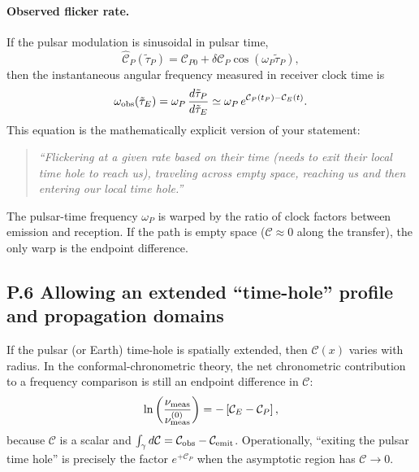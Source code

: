 \documentclass[10pt]{article}
\newcommand{\Eclk}{E}
\begin{document}
\paragraph{Observed flicker rate.}
If the pulsar modulation is sinusoidal in pulsar time,
\begin{equation}
\widehat{\mathcal{C}}_P(\tilde\tau_P)=\mathcal{C}_{P0}+\delta\mathcal{C}_P\cos(\omega_P\tilde\tau_P),
\label{eq:P_sine}
\end{equation}
then the instantaneous angular frequency measured in receiver clock time is
\begin{equation}
\omega_{\rm obs}(\tilde\tau_{\Eclk})
=
\omega_P\,\frac{d\tilde\tau_P}{d\tilde\tau_{\Eclk}}
\simeq
\omega_P\,e^{\mathcal{C}_P(t_P)-\mathcal{C}_{\Eclk}(t)}.
\label{eq:P_omega_obs}
\end{equation}
This equation is the mathematically explicit version of your statement:
\begin{quote}
\emph{``Flickering at a given rate based on their time (needs to exit their local time hole to reach us),
traveling across empty space, reaching us and then entering our local time hole.''}
\end{quote}
The pulsar-time frequency $\omega_P$ is warped by the ratio of clock factors between emission and reception.
If the path is empty space ($\mathcal{C}\approx0$ along the transfer), the only warp is the endpoint difference.

\subsection{P.6 Allowing an extended ``time-hole'' profile and propagation domains}
\label{app:pta:extended}

If the pulsar (or Earth) time-hole is spatially extended, then $\mathcal{C}(x)$ varies with radius.
In the conformal-chronometric theory, the net chronometric contribution to a frequency comparison is still
an endpoint difference in $\mathcal{C}$:
\begin{equation}
\ln\left(\frac{\nu_{\rm meas}}{\nu_{\rm meas}^{(0)}}\right)
=
-\left[\mathcal{C}_{\Eclk}-\mathcal{C}_P\right],
\label{eq:P_endpoint_difference}
\end{equation}
because $\mathcal{C}$ is a scalar and $\int_\gamma d\mathcal{C}=\mathcal{C}_{\rm obs}-\mathcal{C}_{\rm emit}$.
Operationally, ``exiting the pulsar time hole'' is precisely the factor $e^{+\mathcal{C}_P}$ when the asymptotic region has $\mathcal{C}\to0$.
\end{document}
